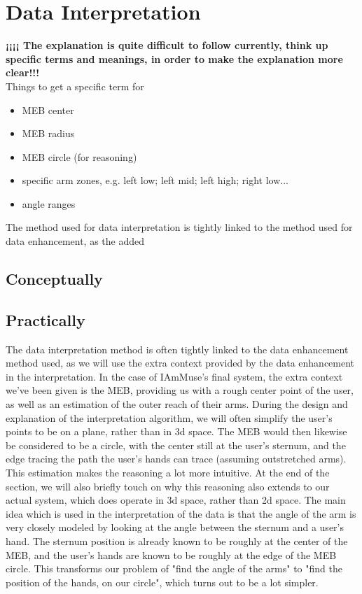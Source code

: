 \section{Data Interpretation}
\label{section: tracking method - data interpretation}

\textbf{¡¡¡¡ The explanation is quite difficult to follow currently, think up specific terms and meanings, in order to make the explanation more clear!!!}\\
Things to get a specific term for
\begin{itemize}
    \item MEB center
    \item MEB radius
    \item MEB circle (for reasoning)
    \item specific arm zones, e.g. left low; left mid; left high; right low...
    \item angle ranges
\end{itemize}

The method used for data interpretation is tightly linked to the method used for data enhancement, as the added 

\subsection{Conceptually}
\label{sub-section: tracking method - data interpretation - conceptually}

\subsection{Practically}
\label{sub-section: tracking method - data interpretation - practically}


The data interpretation method is often tightly linked to the data enhancement method used, as we will use the extra context provided by the data enhancement in the interpretation.
In the case of IAmMuse's final system, the extra context we've been given is the MEB, providing us with a rough center point of the user, as well as an estimation of the outer reach of their arms.
During the design and explanation of the interpretation algorithm, we will often simplify the user's points to be on a plane, rather than in 3d space. 
The MEB would then likewise be considered to be a circle, with the center still at the user's sternum, and the edge tracing the path the user's hands can trace (assuming outstretched arms).
This estimation makes the reasoning a lot more intuitive. At the end of the section, we will also briefly touch on why this reasoning also extends to our actual system, which does operate in 3d space, rather than 2d space.
The main idea which is used in the interpretation of the data is that the angle of the arm is very closely modeled by looking at the angle between the sternum and a user's hand.
The sternum position is already known to be roughly at the center of the MEB, and the user's hands are known to be roughly at the edge of the MEB circle.
This transforms our problem of "find the angle of the arms" to "find the position of the hands, on our circle", which turns out to be a lot simpler.

